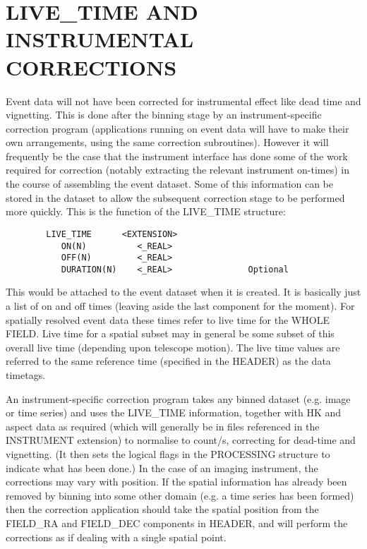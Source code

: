 \section{LIVE\_TIME AND INSTRUMENTAL CORRECTIONS}

Event data will not have been corrected for instrumental  effect  like
dead  time and vignetting.  This is done after the binning stage by an
instrument-specific correction program (applications running on  event
data  will  have  to  make  their  own  arrangements,  using  the same
correction subroutines).  However it will frequently be the case  that
the  instrument  interface  has  done  some  of  the work required for
correction (notably extracting the relevant  instrument  on-times)  in
the  course of assembling the event dataset.  Some of this information
can be stored in the dataset to allow the subsequent correction  stage
to  be  performed more quickly.  This is the function of the LIVE\_TIME
structure:

\begin{verbatim}
        LIVE_TIME      <EXTENSION>
           ON(N)          <_REAL>
           OFF(N)         <_REAL>
           DURATION(N)    <_REAL>               Optional
\end{verbatim}

This would be attached to the event dataset when it is created.  It is
basically  just  a  list  of  on and off times (leaving aside the last
component for the moment).  For spatially resolved  event  data  these
times refer to live time for the WHOLE FIELD.  Live time for a spatial
subset may in general  be  some  subset  of  this  overall  live  time
(depending  upon telescope motion).  The live time values are referred
to the same reference time (specified  in  the  HEADER)  as  the  data
timetags.

An instrument-specific correction program  takes  any  binned  dataset
(e.g.   image  or  time  series)  and  uses the LIVE\_TIME information,
together with HK and aspect data as required (which will generally  be
in  files  referenced  in  the  INSTRUMENT  extension) to normalise to
count/s, correcting for dead-time and vignetting.  (It then  sets  the
logical  flags  in  the PROCESSING structure to indicate what has been
done.) In the case of an imaging instrument, the corrections may  vary
with position.  If the spatial information has already been removed by
binning into some other domain (e.g.  a time series has  been  formed)
then  the correction application should take the spatial position from
the FIELD\_RA and FIELD\_DEC components in HEADER, and will perform  the
corrections as if dealing with a single spatial point.

